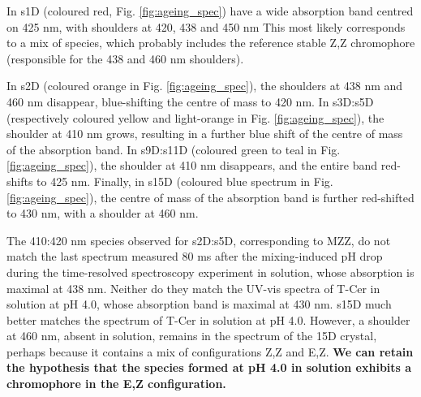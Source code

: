 In s1D (coloured red, Fig. \ref{fig:ageing_spec}) have a wide absorption band centred on 425 nm, with shoulders at 420, 438 and 450 nm  This most likely corresponds to a mix of species, which probably includes the reference stable Z,Z chromophore (responsible for the 438 and 460 nm shoulders). 

In s2D (coloured orange in Fig. \ref{fig:ageing_spec}), the shoulders at 438 nm and 460 nm disappear, blue-shifting the centre of mass to 420 nm. In s3D:s5D (respectively coloured yellow and light-orange in Fig. \ref{fig:ageing_spec}), the shoulder at 410 nm grows, resulting in a further blue shift of the centre of mass of the absorption band. In s9D:s11D (coloured green to teal in Fig. \ref{fig:ageing_spec}), the shoulder at 410 nm disappears, and the entire band red-shifts to 425 nm. Finally, in s15D (coloured blue spectrum in Fig. \ref{fig:ageing_spec}), the centre of mass of the absorption band is further red-shifted to 430 nm, with a shoulder at 460 nm. 

The 410:420 nm species observed for s2D:s5D, corresponding to MZZ, do not match the last spectrum measured 80 ms after the mixing-induced pH drop during the time-resolved spectroscopy experiment in solution, whose absorption is maximal at 438 nm. Neither do they match the UV-vis spectra of T-Cer in solution at pH 4.0, whose absorption band is maximal at 430 nm. s15D much better matches the spectrum of T-Cer in solution at pH 4.0. However, a shoulder at 460 nm, absent in solution, remains in the spectrum of the 15D crystal, perhaps because it contains a mix of configurations Z,Z and E,Z. \textbf{We can retain the hypothesis that the species formed at pH 4.0 in solution exhibits a chromophore in the E,Z configuration.}

